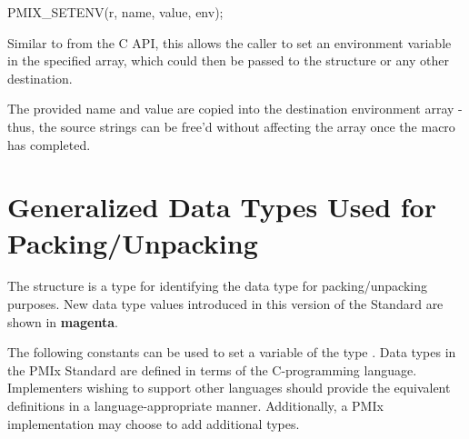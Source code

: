 \cspecificstart
\begin{codepar}
PMIX_SETENV(r, name, value, env);
\end{codepar}
\cspecificend


\begin{arglist}
\end{arglist}

\descr

Similar to  from the C API, this allows the caller to set an environment variable in the specified  array, which could then be passed to the  structure or any other destination.

\adviceuserstart
The provided name and value are copied into the destination environment array - thus, the source strings can be free'd without affecting the array once the macro has completed.
\adviceuserend


\section{Generalized Data Types Used for Packing/Unpacking}

The  structure is a  type for identifying the data type for packing/unpacking purposes. New data type values introduced in this version of the Standard are shown in \textbf{\color{magenta}magenta}.

\adviceimplstart
The following constants can be used to set a variable of the type . Data types in the \ac{PMIx} Standard are defined in terms of the C-programming language. Implementers wishing to support other languages should provide the equivalent definitions in a language-appropriate manner. Additionally, a PMIx implementation may choose to add additional types.
\adviceimplend

